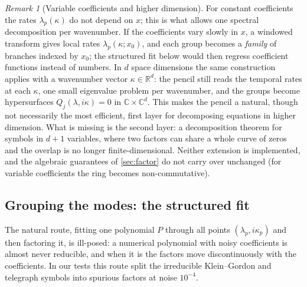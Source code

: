 \documentclass[11pt]{article}
\theoremstyle{plain}
\theoremstyle{definition}
\theoremstyle{remark}
\newtheorem{remark}[theorem]{Remark}
\newcommand{\R}{\mathbb{R}}
\newcommand{\C}{\mathbb{C}}
\begin{document}
\begin{remark}[Variable coefficients and higher dimension]\label{rem:varcoef}
For constant coefficients the rates $\lambda_p(\kappa)$ do not depend on $x$; this is what allows one
spectral decomposition per wavenumber. If the coefficients vary slowly in $x$, a windowed transform
gives local rates $\lambda_p(\kappa;x_0)$, and each group becomes a \emph{family} of branches indexed by
$x_0$; the structured fit below would then regress coefficient functions instead of numbers. In $d$ space dimensions
the same construction applies with a wavenumber vector $\kappa\in\R^d$: the pencil still reads the temporal rates at
each $\kappa$, one small eigenvalue problem per wavenumber, and the groups become hypersurfaces $Q_j(\lambda,i\kappa)=0$
in $\C\times\C^d$. This makes the pencil a natural, though not necessarily the most efficient, first layer for
decomposing equations in higher dimension. What is missing is the second layer: a decomposition theorem for symbols in
$d+1$ variables, where two factors can share a whole curve of zeros and the overlap is no longer finite-dimensional.
Neither extension is implemented, and the algebraic guarantees of \cref{sec:factor} do not carry over unchanged
(for variable coefficients the ring becomes non-commutative).
\end{remark}



\subsection{Grouping the modes: the structured fit}\label{sec:alg-structfit}
The natural route, fitting one polynomial $P$ through all points $(\lambda_p,i\kappa_p)$ and then factoring
it, is ill-posed: a numerical polynomial with noisy coefficients is almost never reducible, and when it is
the factors move discontinuously with the coefficients. In our tests this route split the irreducible
Klein--Gordon and telegraph symbols into spurious factors at noise $10^{-4}$.
\end{document}
